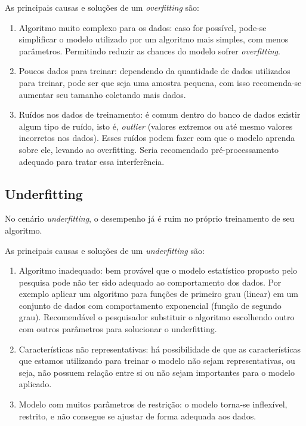 \documentclass[
  openany]{book}
\begin{document}
As principais causas e soluções de um \emph{overfitting} são:

\begin{enumerate}
\def\labelenumi{\arabic{enumi}.}
\item
  Algoritmo muito complexo para os dados: caso for possível, pode-se simplificar o modelo utilizado por um algoritmo mais simples, com menos parâmetros. Permitindo reduzir as chances do modelo sofrer \emph{overfitting}.
\item
  Poucos dados para treinar: dependendo da quantidade de dados utilizados para treinar, pode ser que seja uma amostra pequena, com isso recomenda-se aumentar seu tamanho coletando mais dados.
\item
  Ruídos nos dados de treinamento: é comum dentro do banco de dados existir algum tipo de ruído, isto é, \emph{outlier} (valores extremos ou até mesmo valores incorretos nos dados). Esses ruídos podem fazer com que o modelo aprenda sobre ele, levando ao overfitting. Seria recomendado pré-processamento adequado para tratar essa interferência.
\end{enumerate}

\hypertarget{underfitting}{%
\subsection{\texorpdfstring{\textbf{Underfitting}}{Underfitting}}\label{underfitting}}

No cenário \emph{underfitting}, o desempenho já é ruim no próprio treinamento de seu algoritmo.

As principais causas e soluções de um \emph{underfitting} são:

\begin{enumerate}
\def\labelenumi{\arabic{enumi}.}
\item
  Algoritmo inadequado: bem provável que o modelo estatístico proposto pelo pesquisa pode não ter sido adequado ao comportamento dos dados. Por exemplo aplicar um algoritmo para funções de primeiro grau (linear) em um conjunto de dados com comportamento exponencial (função de segundo grau). Recomendável o pesquisador substituir o algoritmo escolhendo outro com outros parâmetros para solucionar o underfitting.
\item
  Características não representativas: há possibilidade de que as características que estamos utilizando para treinar o modelo não sejam representativas, ou seja, não possuem relação entre si ou não sejam importantes para o modelo aplicado.
\item
  Modelo com muitos parâmetros de restrição: o modelo torna-se inflexível, restrito, e não consegue se ajustar de forma adequada aos dados.
\end{enumerate}
\end{document}
